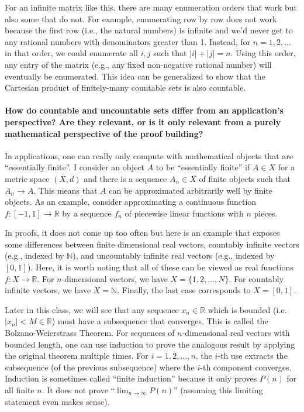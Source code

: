 \documentclass[10pt,english]{article}
\begin{document}
For an infinite matrix like this, there are many enumeration orders that work but also some that do not.
For example, enumerating row by row does not work because the first row (i.e., the natural numbers) is infinite and we'd never get to any rational numbers with denominators greater than 1.
Instead, for $n=1,2,\ldots$ in that order, we could enumerate all $i,j$ such that $|i|+|j|=n$. 
Using this order, any entry of the matrix (e.g., any fixed non-negative rational number) will eventually be enumerated.
This idea can be generalized to show that the Cartesian product of finitely-many countable sets is also countable.

\paragraph{How do countable and uncountable sets differ from an application's perspective? Are they relevant, or is it only relevant from a purely mathematical perspective of the proof building?}

In applications, one can really only compute with mathematical objects that are ``essentially finite''.
I consider an object $A$ to be ``essentially finite'' if $A \in X$ for a metric space $(X,d)$ and there is a sequence $A_n \in X$ of finite objects such that $A_n \to A$.
This means that $A$ can be approximated arbitrarily well by finite objects.
As an example, consider approximating a continuous function $f\colon [-1,1] \to \mathbb{R}$ by a sequence $f_n$ of piecewise linear functions with $n$ pieces.
 
In proofs, it does not come up too often but here is an example that exposes some differences between finite dimensional real vectors, countably infinite vectors (e.g., indexed by $\mathbb{N}$), and uncountably infinite real vectors (e.g., indexed by $[0,1]$).
Here, it is worth noting that all of these can be viewed as real functions $f\colon X \to \mathbb{R}$.
For $n$-dimensional vectors, we have $X =  \{1,2,\ldots,N\}$.
For countably infinite vectors, we have $X=\mathbb{N}$.
Finally, the last case corresponds to $X=[0,1]$.

Later in this class, we will see that any sequence $x_n \in \mathbb{R}$ which is bounded (i.e. $|x_n| < M \in \mathbb{R}$) must have a subsequence that converges.
This is called the Bolzano-Weierstrass Theorem.
For sequences of $n$-dimensional real vectors with bounded length, one can use induction to prove the analogous result by applying the original theorem multiple times.
For $i=1,2,\dots,n$, the $i$-th use extracts the subsequence (of the previous subsequence) where the $i$-th component converges.
Induction is sometimes called ``finite induction'' because it only proves $P(n)$ for all finite $n$.
It does not prove ``$\lim_{n\to\infty} P(n)$'' (assuming this limiting statement even makes sense).
\end{document}
